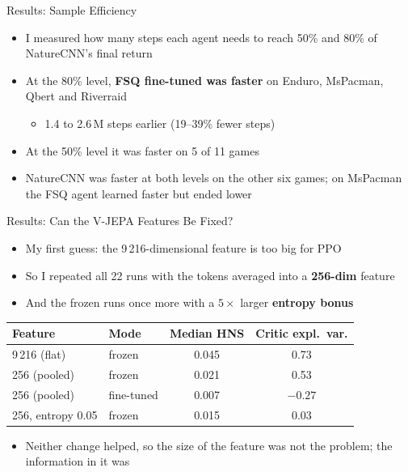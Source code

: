 \documentclass[aspectratio=43,10pt]{beamer}
\begin{document}
\begin{frame}{Results: Sample Efficiency}
  \begin{itemize}\setlength\itemsep{0.6em}
    \item I measured how many steps each agent needs to reach 50\% and 80\% of NatureCNN's
          final return
    \item At the 80\% level, \textbf{FSQ fine-tuned was faster} on Enduro, MsPacman, Qbert
          and Riverraid
      \begin{itemize}
        \item 1.4 to 2.6\,M steps earlier (19--39\% fewer steps)
      \end{itemize}
    \item At the 50\% level it was faster on 5 of 11 games
    \item NatureCNN was faster at both levels on the other six games; on MsPacman the FSQ agent
          learned faster but ended lower
  \end{itemize}
\end{frame}

\begin{frame}{Results: Can the V-JEPA Features Be Fixed?}
  \begin{itemize}\setlength\itemsep{0.55em}
    \item My first guess: the 9\,216-dimensional feature is too big for PPO
    \item So I repeated all 22 runs with the tokens averaged into a \textbf{256-dim} feature
    \item And the frozen runs once more with a $5\times$ larger \textbf{entropy bonus}
  \end{itemize}
  \vspace{0.3em}
  \centering
  {\small
  \begin{tabular}{@{}llcc@{}}
    \toprule
    Feature & Mode & Median HNS & Critic expl.\ var. \\
    \midrule
    9\,216 (flat) & frozen & 0.045 & 0.73 \\
    256 (pooled) & frozen & 0.021 & 0.53 \\
    256 (pooled) & fine-tuned & 0.007 & $-0.27$ \\
    256, entropy 0.05 & frozen & 0.015 & 0.03 \\
    \bottomrule
  \end{tabular}}
  \vspace{0.5em}
  \begin{itemize}\small
    \item Neither change helped, so the size of the feature was not the problem; the
          information in it was
  \end{itemize}
\end{frame}
\end{document}
